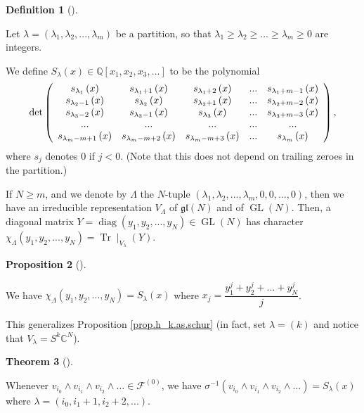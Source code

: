 \documentclass
[numbers=enddot,12pt,final,onecolumn,german,notitlepage]{scrartcl}%
\theoremstyle{definition}
\newtheorem{theo}{Theorem}
\newenvironment{theorem}[1][]
{\begin{theo}[#1]\begin{leftbar}}
{\end{leftbar}\end{theo}}
\newtheorem{prop}[theo]{Proposition}
\newenvironment{proposition}[1][]
{\begin{prop}[#1]\begin{leftbar}}
{\end{leftbar}\end{prop}}
\newtheorem{defi}[theo]{Definition}
\newenvironment{definition}[1][]
{\begin{defi}[#1]\begin{leftbar}}
{\end{leftbar}\end{defi}}
\begin{document}
\begin{definition}
Let $\lambda=\left(  \lambda_{1},\lambda_{2},...,\lambda_{m}\right)  $ be a
partition, so that $\lambda_{1}\geq\lambda_{2}\geq...\geq\lambda_{m}\geq0$ are integers.

We define $S_{\lambda}\left(  x\right)  \in\mathbb{Q}\left[  x_{1},x_{2}%
,x_{3},...\right]  $ to be the polynomial%
\[
\det\left(
\begin{array}
[c]{ccccc}%
s_{\lambda_{1}}\left(  x\right)  & s_{\lambda_{1}+1}\left(  x\right)  &
s_{\lambda_{1}+2}\left(  x\right)  & ... & s_{\lambda_{1}+m-1}\left(  x\right)
\\
s_{\lambda_{2}-1}\left(  x\right)  & s_{\lambda_{2}}\left(  x\right)  &
s_{\lambda_{2}+1}\left(  x\right)  & ... & s_{\lambda_{2}+m-2}\left(  x\right)
\\
s_{\lambda_{3}-2}\left(  x\right)  & s_{\lambda_{3}-1}\left(  x\right)  &
s_{\lambda_{3}}\left(  x\right)  & ... & s_{\lambda_{3}+m-3}\left(  x\right)
\\
... & ... & ... & ... & ...\\
s_{\lambda_{m}-m+1}\left(  x\right)  & s_{\lambda_{m}-m+2}\left(  x\right)  &
s_{\lambda_{m}-m+3}\left(  x\right)  & ... & s_{\lambda_{m}}\left(  x\right)
\end{array}
\right)  ,
\]
where $s_{j}$ denotes $0$ if $j<0$. (Note that this does not depend on
trailing zeroes in the partition.)

If $N\geq m$, and we denote by $\Lambda$ the $N$-tuple $\left(  \lambda
_{1},\lambda_{2},...,\lambda_{m},0,0,...,0\right)  $, then we have an
irreducible representation $V_{\Lambda}$ of $\mathfrak{gl}\left(  N\right)  $
and of $\operatorname*{GL}\left(  N\right)  $. Then, a diagonal matrix
$Y=\operatorname*{diag}\left(  y_{1},y_{2},...,y_{N}\right)  \in
\operatorname*{GL}\left(  N\right)  $ has character $\chi_{\Lambda}\left(
y_{1},y_{2},...,y_{N}\right)  =\operatorname*{Tr}\mid_{V_{\lambda}}\left(
Y\right)  $.
\end{definition}

\begin{proposition}
We have $\chi_{\Lambda}\left(  y_{1},y_{2},...,y_{N}\right)  =S_{\lambda
}\left(  x\right)  $ where $x_{j}=\dfrac{y_{1}^{j}+y_{2}^{j}+...+y_{N}^{j}}%
{j}$.
\end{proposition}

This generalizes Proposition \ref{prop.h_k.as.schur} (in fact, set
$\lambda=\left(  k\right)  $ and notice that $V_{\lambda}=S^{k}\mathbb{C}^{N}$).

\begin{theorem}
Whenever $v_{i_{0}}\wedge v_{i_{1}}\wedge v_{i_{2}}\wedge...\in\mathcal{F}%
^{\left(  0\right)  }$, we have $\sigma^{-1}\left(  v_{i_{0}}\wedge v_{i_{1}%
}\wedge v_{i_{2}}\wedge...\right)  =S_{\lambda}\left(  x\right)  $ where
$\lambda=\left(  i_{0},i_{1}+1,i_{2}+2,...\right)  $.
\end{theorem}
\end{document}
